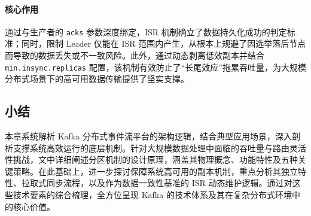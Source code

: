 			\paragraph{核心作用}
			通过与生产者的 \texttt{acks} 参数深度绑定，ISR 机制确立了数据持久化成功的判定标准；同时，限制 Leader 仅能在 ISR 范围内产生，从根本上规避了因选举落后节点而导致的数据丢失或不一致风险。此外，通过动态剥离低效副本并结合 \texttt{min.insync.replicas} 配置，该机制有效防止了“长尾效应”拖累吞吐量，为大规模分布式场景下的高可用数据传输提供了坚实支撑。
	
	\subsection{小结}
	本章系统解析 Kafka 分布式事件流平台的架构逻辑，结合典型应用场景，深入剖析支撑系统高效运行的底层机制。针对大规模数据处理中面临的吞吐量与路由灵活性挑战，文中详细阐述分区机制的设计原理，涵盖其物理概念、功能特性及五种关键策略。在此基础上，进一步探讨保障系统高可用的副本机制，重点分析其独立特性、拉取式同步流程，以及作为数据一致性基准的 ISR 动态维护逻辑。通过对这些技术要素的综合梳理，全方位呈现 Kafka 的技术体系及其在复杂分布式环境中的核心价值。
